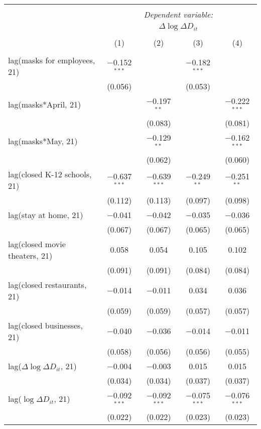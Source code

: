 \begin{tabular}{@{\extracolsep{1pt}}lcccc} 
\\[-1.8ex]\hline 
\hline \\[-1.8ex] 
 & \multicolumn{4}{c}{\textit{Dependent variable:}} \\ 
\cline{2-5} 
 & \multicolumn{4}{c}{$\Delta \log \Delta D_{it}$} \\ 
\\[-1.8ex] & (1) & (2) & (3) & (4)\\ 
\hline \\[-1.8ex] 
 lag(masks for employees, 21) & $-$0.152$^{***}$ &  & $-$0.182$^{***}$ &  \\ 
  & (0.056) &  & (0.053) &  \\ 
  lag(masks*April, 21) &  & $-$0.197$^{**}$ &  & $-$0.222$^{***}$ \\ 
  &  & (0.083) &  & (0.081) \\ 
  lag(masks*May, 21) &  & $-$0.129$^{**}$ &  & $-$0.162$^{***}$ \\ 
  &  & (0.062) &  & (0.060) \\ 
  lag(closed K-12 schools, 21) & $-$0.637$^{***}$ & $-$0.639$^{***}$ & $-$0.249$^{**}$ & $-$0.251$^{**}$ \\ 
  & (0.112) & (0.113) & (0.097) & (0.098) \\ 
  lag(stay at home, 21) & $-$0.041 & $-$0.042 & $-$0.035 & $-$0.036 \\ 
  & (0.067) & (0.067) & (0.065) & (0.065) \\ 
  lag(closed movie theaters, 21) & 0.058 & 0.054 & 0.105 & 0.102 \\ 
  & (0.091) & (0.091) & (0.084) & (0.084) \\ 
  lag(closed restaurants, 21) & $-$0.014 & $-$0.011 & 0.034 & 0.036 \\ 
  & (0.059) & (0.059) & (0.057) & (0.057) \\ 
  lag(closed businesses, 21) & $-$0.040 & $-$0.036 & $-$0.014 & $-$0.011 \\ 
  & (0.058) & (0.056) & (0.056) & (0.055) \\ 
  lag($\Delta \log \Delta D_{it}$, 21) & $-$0.004 & $-$0.003 & 0.015 & 0.015 \\ 
  & (0.034) & (0.034) & (0.037) & (0.037) \\ 
  lag($\log \Delta D_{it}$, 21) & $-$0.092$^{***}$ & $-$0.092$^{***}$ & $-$0.075$^{***}$ & $-$0.076$^{***}$ \\ 
  & (0.022) & (0.022) & (0.023) & (0.023) \\ 

\end{tabular}
